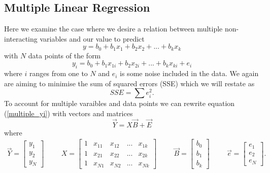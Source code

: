 \documentclass[12pt,a4paper]{report}
\begin{document}
		\subsection{Multiple Linear Regression}
		Here we examine the case where we desire a relation between multiple non-interacting variables and our value to predict
		\begin{equation}
			y = b_{0} + b_{1}x_{1}+b_{2}x_{2} + ... + b_{k}x_{k}
			\label{multiple_y}
		\end{equation}
		with $N$ data points of the form
		\begin{equation}
			y_{i} = b_{0} + b_{1}x_{1i}+b_{2}x_{2i} + ... + b_{k}x_{ki} + e_{i}
			\label{multiple_yi}
		\end{equation}
		where $i$ ranges from one to $N$ and $e_{i}$ is some noise included in the data. We again are aiming to minimise the sum of squared errors (SSE) which we will restate as 
		\begin{equation}
			SSE=\sum e_{i}^{2}.
			\label{SSE}
		\end{equation}
		To account for multiple varaibles and data points we can rewrite equation (\ref{multiple_yi}) with vectors and matrices
		\begin{equation}
			\vec{Y} = X\vec{B} + \vec{E}
		\end{equation}
		where
		\begin{align}
			\vec{Y} = \left[\begin{matrix}
					y_{1}\\
					y_{2}\\
					y_{N}
				\end{matrix}\right]
			\hspace{1cm}
			X = \left[\begin{matrix} 
					1 & x_{11} & x_{12} & ... & x_{1k}\\
					1 & x_{21} & x_{22} & ... & x_{2k}\\
					1 & x_{N1} & x_{N2} & ... & x_{Nk}
				\end{matrix}\right]
			\hspace{1cm}
			\vec{B} = \left[\begin{matrix}
					b_{0}\\
					b_{1}\\
					b_{k}
				\end{matrix}\right]
			\hspace{1cm}
			\vec{e} = \left[\begin{matrix}
					e_{1}\\
					e_{2}\\
					e_{N}
				\end{matrix}\right].
		\end{align}
\end{document}
